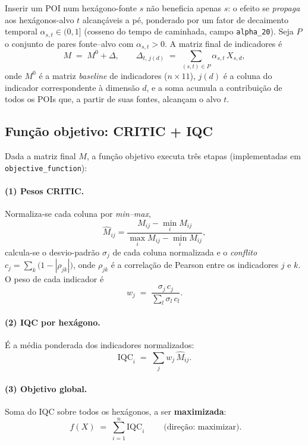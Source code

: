 \documentclass[11pt,a4paper]{article}
\begin{document}
Inserir um POI num hexágono-fonte $s$ não beneficia apenas $s$: o efeito
se \emph{propaga} aos hexágonos-alvo $t$ alcançáveis a pé, ponderado por um fator
de decaimento temporal $\alpha_{s,t}\in(0,1]$ (cosseno do tempo de caminhada,
campo \texttt{alpha\_20}). Seja $P$ o conjunto de pares fonte--alvo com
$\alpha_{s,t}>0$. A matriz final de indicadores é
\begin{equation}
M \;=\; M^{0} + \Delta,
\qquad
\Delta_{t,\,j(d)} \;=\; \sum_{(s,t)\in P} \alpha_{s,t}\, X_{s,d},
\label{eq:propagacao}
\end{equation}
onde $M^{0}$ é a matriz \emph{baseline} de indicadores ($n\times 11$),
$j(d)$ é a coluna do indicador correspondente à dimensão $d$, e a soma
acumula a contribuição de todos os POIs que, a partir de suas fontes, alcançam
o alvo $t$.

\subsection{Função objetivo: CRITIC + IQC}

Dada a matriz final $M$, a função objetivo executa três etapas
(implementadas em \texttt{objective\_function}):

\paragraph{(1) Pesos CRITIC.} Normaliza-se cada coluna por \emph{min--max},
\begin{equation}
\hat{M}_{ij} = \frac{M_{ij}-\min_i M_{ij}}{\max_i M_{ij}-\min_i M_{ij}},
\end{equation}
calcula-se o desvio-padrão $\sigma_j$ de cada coluna normalizada e o
\emph{conflito} $c_j=\sum_k\bigl(1-|\rho_{jk}|\bigr)$, onde $\rho_{jk}$ é a
correlação de Pearson entre os indicadores $j$ e $k$. O peso de cada indicador é
\begin{equation}
w_j \;=\; \frac{\sigma_j\, c_j}{\sum_{l}\sigma_l\, c_l}.
\label{eq:critic}
\end{equation}

\paragraph{(2) IQC por hexágono.} É a média ponderada dos indicadores
normalizados:
\begin{equation}
\mathrm{IQC}_i \;=\; \sum_{j} w_j\, \hat{M}_{ij}.
\label{eq:iqc}
\end{equation}

\paragraph{(3) Objetivo global.} Soma do IQC sobre todos os hexágonos, a ser
\textbf{maximizada}:
\begin{equation}
\boxed{\;f(X) \;=\; \sum_{i=1}^{n}\mathrm{IQC}_i\;}
\qquad\text{(direção: maximizar).}
\label{eq:objetivo}
\end{equation}
\end{document}
